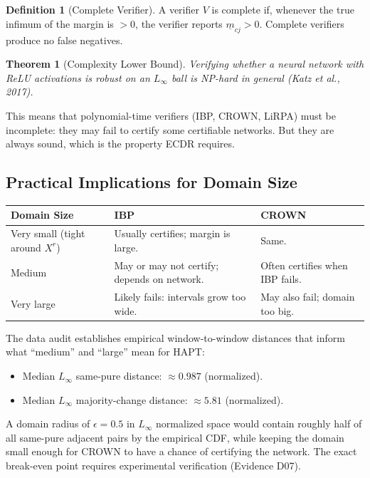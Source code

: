 \documentclass[11pt, a4paper]{article}
\theoremstyle{definition}
\newtheorem{definition}{Definition}[section]
\theoremstyle{plain}
\newtheorem{theorem}{Theorem}[section]
\newcommand{\mbm}[1]{\underline{m}_{#1}}
\begin{document}
\begin{definition}[Complete Verifier]
  A verifier $V$ is complete if, whenever the true infimum of the margin is $> 0$,
  the verifier reports $\mbm{cj} > 0$. Complete verifiers produce no false negatives.
\end{definition}

\begin{theorem}[Complexity Lower Bound]
  Verifying whether a neural network with ReLU activations is robust on an
  $L_\infty$ ball is NP-hard in general (Katz et al., 2017).
\end{theorem}

This means that polynomial-time verifiers (IBP, CROWN, LiRPA) must be
incomplete: they may fail to certify some certifiable networks. But they
are always sound, which is the property ECDR requires.

\subsection{Practical Implications for Domain Size}

\begin{center}
\small
\begin{tabularx}{\linewidth}{@{}lYY@{}}
\toprule
Domain Size & IBP & CROWN \\
\midrule
Very small (tight around $X^r$) & Usually certifies; margin is large. & Same. \\
Medium & May or may not certify; depends on network. & Often certifies when IBP fails. \\
Very large & Likely fails: intervals grow too wide. & May also fail; domain too big. \\
\bottomrule
\end{tabularx}
\end{center}

The data audit establishes empirical window-to-window distances that inform
what ``medium'' and ``large'' mean for HAPT:
\begin{itemize}[leftmargin=1.5em]
  \item Median $L_\infty$ same-pure distance: $\approx 0.987$ (normalized).
  \item Median $L_\infty$ majority-change distance: $\approx 5.81$ (normalized).
\end{itemize}
A domain radius of $\epsilon = 0.5$ in $L_\infty$ normalized space would contain
roughly half of all same-pure adjacent pairs by the empirical CDF, while keeping
the domain small enough for CROWN to have a chance of certifying the network.
The exact break-even point requires experimental verification (Evidence D07).
\end{document}
